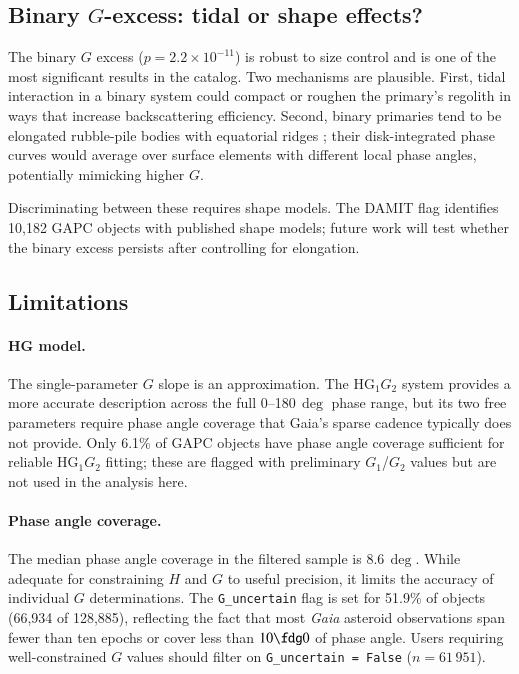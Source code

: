 \documentclass{aa}
\newcommand{\gapc}{GAPC\xspace}
\newcommand{\gaia}{{\it Gaia}\xspace}
\begin{document}
\subsection{Binary \texorpdfstring{$G$}{G}-excess: tidal or shape effects?}
\label{sec:discuss_binary}

The binary $G$ excess ($p = 2.2 \times 10^{-11}$) is robust to size
control and is one of the most significant results in the catalog.
Two mechanisms are plausible.  First, tidal interaction in a binary system
could compact or roughen the primary's regolith in ways that increase
backscattering efficiency.  Second, binary primaries tend to be elongated
rubble-pile bodies with equatorial ridges \citep{walsh2008}; their
disk-integrated phase curves would average over surface elements with
different local phase angles, potentially mimicking higher $G$.

Discriminating between these requires shape models.  The DAMIT flag
identifies 10,182 GAPC objects with published shape models; future work
will test whether the binary excess persists after controlling for
elongation.

\subsection{Limitations}
\label{sec:limitations}

\paragraph{HG model.}
The single-parameter $G$ slope is an approximation.  The HG$_1G_2$
system \citep{muinonen2010} provides a more accurate description across
the full 0–180\,$\deg$ phase range, but its two free parameters require
phase angle coverage that Gaia's sparse cadence typically does not
provide.  Only 6.1\% of \gapc objects have phase angle coverage sufficient
for reliable HG$_1G_2$ fitting; these are flagged with preliminary
$G_1$/$G_2$ values but are not used in the analysis here.

\paragraph{Phase angle coverage.}
The median phase angle coverage in the filtered sample is 8.6\,$\deg$.
While adequate for constraining $H$ and $G$ to useful precision, it
limits the accuracy of individual $G$ determinations.  The
\texttt{G\_uncertain} flag is set for 51.9\% of objects (66,934 of
128,885), reflecting the fact that most \gaia asteroid observations
span fewer than ten epochs or cover less than $10\fdg0$ of phase angle.
Users requiring well-constrained $G$ values should filter on
\texttt{G\_uncertain = False} ($n = 61\,951$).
\end{document}
